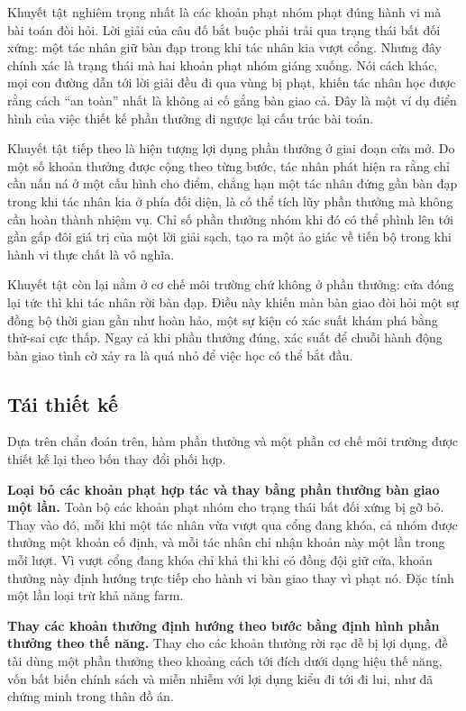 \indent Khuyết tật nghiêm trọng nhất là các khoản phạt nhóm phạt
đúng hành vi mà bài toán đòi hỏi. Lời giải của câu đố bắt buộc phải trải qua trạng thái
bất đối xứng: một tác nhân giữ bàn đạp trong khi tác nhân kia vượt cổng. Nhưng đây chính
xác là trạng thái mà hai khoản phạt nhóm giáng xuống. Nói cách khác, mọi con đường dẫn
tới lời giải đều đi qua vùng bị phạt, khiến tác nhân học được rằng cách ``an toàn'' nhất
là không ai cố gắng bàn giao cả. Đây là một ví dụ điển hình của việc thiết kế phần
thưởng đi ngược lại cấu trúc bài toán.

\indent Khuyết tật tiếp theo là hiện tượng lợi dụng phần thưởng ở giai đoạn cửa mở.
Do một số khoản thưởng được cộng theo từng bước, tác nhân phát hiện ra rằng chỉ cần nấn
ná ở một cấu hình cho điểm, chẳng hạn một tác nhân đứng gần bàn đạp trong khi tác nhân
kia ở phía đối diện, là có thể tích lũy phần thưởng mà không cần hoàn thành nhiệm vụ.
Chỉ số phần thưởng nhóm khi đó có thể phình lên tới gần gấp đôi giá trị của một lời giải
sạch, tạo ra một ảo giác về tiến bộ trong khi hành vi thực chất là vô nghĩa.

\indent Khuyết tật còn lại nằm ở cơ chế môi trường chứ không ở phần thưởng: cửa đóng lại
tức thì khi tác nhân rời bàn đạp. Điều này khiến màn bàn giao đòi hỏi một sự đồng
bộ thời gian gần như hoàn hảo, một sự kiện có xác suất khám phá bằng thử-sai cực thấp.
Ngay cả khi phần thưởng đúng, xác suất để chuỗi hành động bàn giao tình cờ xảy ra là quá
nhỏ để việc học có thể bắt đầu.

\subsection{Tái thiết kế}
\indent Dựa trên chẩn đoán trên, hàm phần thưởng và một phần cơ chế môi trường được
thiết kế lại theo bốn thay đổi phối hợp.

\indent \textbf{Loại bỏ các khoản phạt hợp tác và thay bằng phần thưởng bàn
giao một lần.} Toàn bộ các khoản phạt nhóm cho trạng thái bất đối xứng bị gỡ bỏ. Thay
vào đó, mỗi khi một tác nhân vừa vượt qua cổng đang khóa, cả nhóm được thưởng một khoản
cố định, và mỗi tác nhân chỉ nhận khoản này một lần trong mỗi lượt. Vì vượt cổng đang
khóa chỉ khả thi khi có đồng đội giữ cửa, khoản thưởng này định hướng trực tiếp cho hành
vi bàn giao thay vì phạt nó. Đặc tính một lần loại trừ khả năng farm.

\indent \textbf{Thay các khoản thưởng định hướng theo bước bằng định hình phần
thưởng theo thế năng.} Thay cho các khoản thưởng rời rạc dễ bị lợi dụng, đề tài dùng một
phần thưởng theo khoảng cách tới đích dưới dạng hiệu thế năng, vốn bất biến chính sách
và miễn nhiễm với lợi dụng kiểu đi tới đi lui, như đã chứng minh trong thân đồ án.

